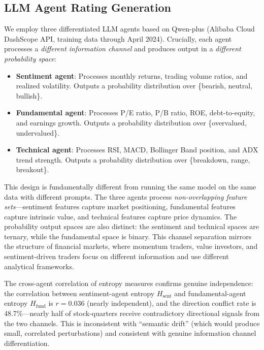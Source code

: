 \documentclass[12pt,a4paper]{article}
\begin{document}
\subsection{LLM Agent Rating Generation}\label{sec:agents}

We employ three differentiated LLM agents based on Qwen-plus (Alibaba Cloud DashScope API, training data through April 2024). Crucially, each agent processes a \textit{different information channel} and produces output in a \textit{different probability space}:

\begin{itemize}
\item \textbf{Sentiment agent}: Processes monthly returns, trading volume ratios, and realized volatility. Outputs a probability distribution over \{bearish, neutral, bullish\}.
\item \textbf{Fundamental agent}: Processes P/E ratio, P/B ratio, ROE, debt-to-equity, and earnings growth. Outputs a probability distribution over \{overvalued, undervalued\}.
\item \textbf{Technical agent}: Processes RSI, MACD, Bollinger Band position, and ADX trend strength. Outputs a probability distribution over \{breakdown, range, breakout\}.
\end{itemize}

This design is fundamentally different from running the same model on the same data with different prompts. The three agents process \textit{non-overlapping feature sets}---sentiment features capture market positioning, fundamental features capture intrinsic value, and technical features capture price dynamics. The probability output spaces are also distinct: the sentiment and technical spaces are ternary, while the fundamental space is binary. This channel separation mirrors the structure of financial markets, where momentum traders, value investors, and sentiment-driven traders focus on different information and use different analytical frameworks.

The cross-agent correlation of entropy measures confirms genuine independence: the correlation between sentiment-agent entropy $H_{\text{sent}}$ and fundamental-agent entropy $H_{\text{fund}}$ is $r = 0.036$ (nearly independent), and the direction conflict rate is 48.7\%---nearly half of stock-quarters receive contradictory directional signals from the two channels. This is inconsistent with ``semantic drift'' (which would produce small, correlated perturbations) and consistent with genuine information channel differentiation.
\end{document}
